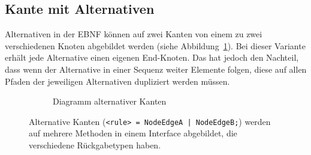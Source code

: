 \documentclass[../InterneDSLs.tex]{subfiles}
\begin{document}
\subsection{Kante mit Alternativen}\label{SEC:Alternative}
Alternativen in der EBNF können auf zwei Kanten von einem zu zwei verschiedenen Knoten abgebildet werden (siehe Abbildung~\ref{FIG:DiagramAlternativeNodeVariant}). Bei dieser Variante erhält jede Alternative einen eigenen End-Knoten. Das hat jedoch den Nachteil, dass wenn der Alternative in einer Sequenz weiter Elemente folgen, diese auf allen Pfaden der jeweiligen Alternativen dupliziert werden müssen.
\begin{figure}[ht]
\centering
  \begin{subfigure}[c]{0.49\textwidth}
    \caption{Diagramm alternativer Kanten}
    \label{FIG:DiagramAlternativeNodeVariant}
  \end{subfigure}
  \begin{subfigure}[c]{0.49\textwidth}
    
  \end{subfigure}
  \caption{Alternative Kanten (\texttt{<rule> = NodeEdgeA | NodeEdgeB;}) werden auf mehrere Methoden in einem Interface abgebildet, die verschiedene Rückgabetypen haben.}
  \label{FIG:AlternativeNodeVariant}
\end{figure}
\end{document}
